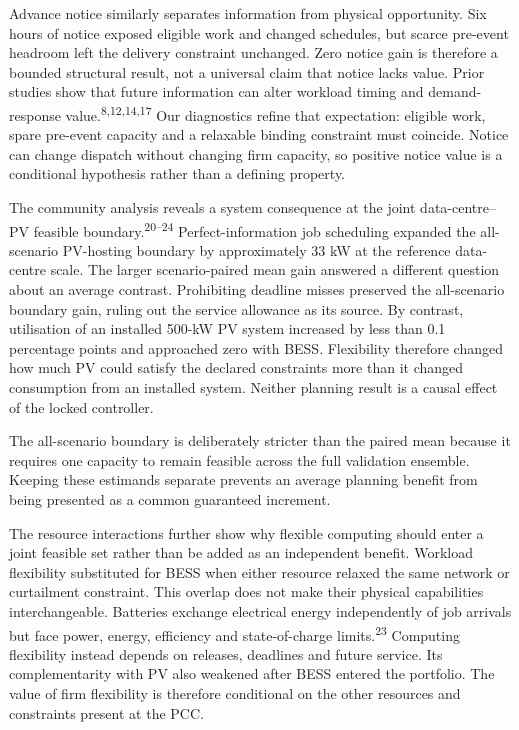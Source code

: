 \documentclass[10pt,a4paper]{article}
\begin{document}
Advance notice similarly separates information from physical opportunity. Six hours of notice exposed eligible work and changed schedules, but scarce pre-event headroom left the delivery constraint unchanged. Zero notice gain is therefore a bounded structural result, not a universal claim that notice lacks value. Prior studies show that future information can alter workload timing and demand-response value.\textsuperscript{8,12,14,17} Our diagnostics refine that expectation: eligible work, spare pre-event capacity and a relaxable binding constraint must coincide. Notice can change dispatch without changing firm capacity, so positive notice value is a conditional hypothesis rather than a defining property.


The community analysis reveals a system consequence at the joint data-centre–PV feasible boundary.\textsuperscript{20–24} Perfect-information job scheduling expanded the all-scenario PV-hosting boundary by approximately 33 kW at the reference data-centre scale. The larger scenario-paired mean gain answered a different question about an average contrast. Prohibiting deadline misses preserved the all-scenario boundary gain, ruling out the service allowance as its source. By contrast, utilisation of an installed 500-kW PV system increased by less than 0.1 percentage points and approached zero with BESS. Flexibility therefore changed how much PV could satisfy the declared constraints more than it changed consumption from an installed system. Neither planning result is a causal effect of the locked controller.


The all-scenario boundary is deliberately stricter than the paired mean because it requires one capacity to remain feasible across the full validation ensemble. Keeping these estimands separate prevents an average planning benefit from being presented as a common guaranteed increment.


The resource interactions further show why flexible computing should enter a joint feasible set rather than be added as an independent benefit. Workload flexibility substituted for BESS when either resource relaxed the same network or curtailment constraint. This overlap does not make their physical capabilities interchangeable. Batteries exchange electrical energy independently of job arrivals but face power, energy, efficiency and state-of-charge limits.\textsuperscript{23} Computing flexibility instead depends on releases, deadlines and future service. Its complementarity with PV also weakened after BESS entered the portfolio. The value of firm flexibility is therefore conditional on the other resources and constraints present at the PCC.
\end{document}
